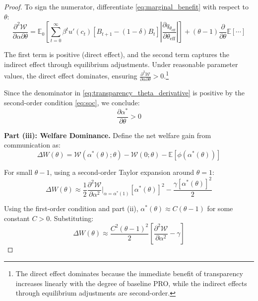 \documentclass[12pt]{article}
\theoremstyle{plain}
\begin{document}
\begin{proof}
	To sign the numerator, differentiate \eqref{eq:marginal_benefit} with respect
	to $\theta$:
	\begin{equation}
		\frac{\partial^2 \mathcal{W}}{\partial \alpha \partial \theta} = \mathbb{E}_0 \left[ \sum_{t=0}^\infty \beta^t u'(c_t) [B_{t+1} - (1-\delta)B_t] \left|\frac{\partial q_{\theta_{\text{eff}}}}{\partial \theta_{\text{eff}}}\right| \right] + (\theta-1) \frac{\partial}{\partial \theta} \mathbb{E}[\cdots] \label{eq:cross_derivative}
	\end{equation}

	The first term is positive (direct effect), and the second term captures the
	indirect effect through equilibrium adjustments. Under reasonable parameter
	values, the direct effect dominates, ensuring $\frac{\partial^2
			\mathcal{W}}{\partial \alpha \partial \theta} > 0$.\footnote{The direct effect
		dominates because the immediate benefit of transparency increases linearly with
		the degree of baseline PRO, while the indirect effects through equilibrium
		adjustments are second-order.}

	Since the denominator in \eqref{eq:transparency_theta_derivative} is positive
	by the second-order condition \eqref{eq:soc}, we conclude:
	\begin{equation}
		\frac{\partial
			\alpha^*}{\partial \theta} > 0 \label{eq:transparency_increasing}
	\end{equation}

	\textbf{Part (iii): Welfare Dominance.}
	Define the net welfare gain from communication as:
	\begin{equation}
		\Delta W(\theta) = \mathcal{W}(\alpha^*(\theta); \theta) - \mathcal{W}(0; \theta) - \mathbb{E}[\phi(\alpha^*(\theta))] \label{eq:welfare_gain}
	\end{equation}

	For small $\theta-1$, using a second-order Taylor expansion around $\theta =
		1$:
	\begin{equation}
		\Delta W(\theta) \approx \frac{1}{2} \frac{\partial^2 \mathcal{W}}{\partial \alpha^2}\bigg|_{\alpha=\alpha^*(1)} [\alpha^*(\theta)]^2 - \frac{\gamma [\alpha^*(\theta)]^2}{2} \label{eq:welfare_expansion}
	\end{equation}

	Using the first-order condition and part (ii), $\alpha^*(\theta) \approx
		C(\theta-1)$ for some constant $C > 0$. Substituting:
	\begin{equation}
		\Delta W(\theta) \approx \frac{C^2(\theta-1)^2}{2} \left[ \frac{\partial^2 \mathcal{W}}{\partial \alpha^2} - \gamma \right] \label{eq:welfare_approximation}
	\end{equation}


\end{proof}
\end{document}
